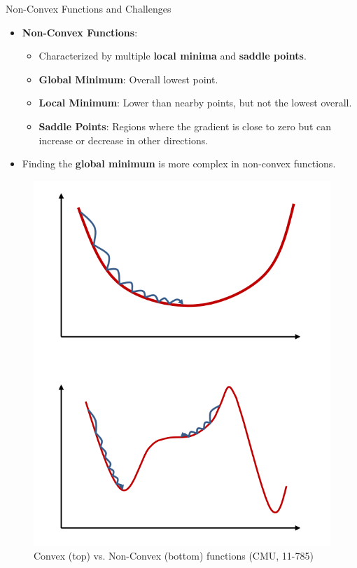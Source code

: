 \documentclass[serif, aspectratio=169]{beamer}
\begin{document}
\begin{frame}{Non-Convex Functions and Challenges}
\begin{minipage}{0.45\linewidth}
    \begin{itemize}
        \item \textbf{Non-Convex Functions}:
        \begin{itemize}
            \item Characterized by multiple \textbf{local minima} and \textbf{saddle points}.
            \item \textbf{Global Minimum}: Overall lowest point.
            \item \textbf{Local Minimum}: Lower than nearby points, but not the lowest overall.
            \item \textbf{Saddle Points}: Regions where the gradient is close to zero but can increase or decrease in other directions.
        \end{itemize}
        \item Finding the \textbf{global minimum} is more complex in non-convex functions.
    \end{itemize}
\end{minipage}%
\begin{minipage}{0.45\linewidth}
    \begin{figure}[h]
        \centering
        \includegraphics[height=0.6\textheight]{pic/convex_nonconvex.png}
        \caption{ Convex (top) vs. Non-Convex (bottom) functions (CMU, 11-785)}
    \end{figure}
\end{minipage}
\end{frame}
\end{document}
